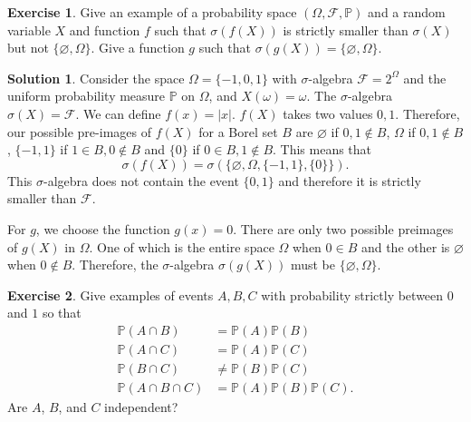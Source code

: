 \documentclass[12pt]{article}
\newcommand{\Prob}{\mathbb{P}}
\newcommand{\calF}{\mathcal{F}}
\newcommand{\abs}[1]{ \left| #1 \right| }
\theoremstyle{definition}
\newtheorem{exer}{Exercise}
\newtheorem{sol}{Solution}
\theoremstyle{remark}
\begin{document}
\begin{exer}
    Give an example of a probability space $(\Omega, \calF, \Prob)$ and a random variable $X$ and function $f$ such that $\sigma(f(X))$ is strictly smaller than $\sigma(X)$ but not $\{\varnothing, \Omega \}$. Give a function $g$ such that $\sigma(g(X)) = \{ \varnothing, \Omega\}$. 
\end{exer}

\begin{sol}
    Consider the space $\Omega = \{-1, 0, 1 \}$ with $\sigma$-algebra $\calF = 2^\Omega$ and the uniform probability measure $\Prob$ on $\Omega$, and $X(\omega) = \omega$. The $\sigma$-algebra $\sigma(X) = \calF$. We can define $f(x) = \abs{x}$. $f(X)$ takes two values $0, 1$. Therefore, our possible pre-images of $f(X)$ for a Borel set $B$ are $\varnothing$ if $0, 1 \notin B$, $\Omega$ if $0,1 \notin B$, $\{-1,1 \}$ if $1\in B, 0\not\in B$ and $\{0\}$ if $0\in B, 1\notin B$. This means that
    \begin{equation}
        \sigma(f(X)) = \sigma( \{ \varnothing, \Omega, \{-1, 1\}, \{0\} \}).
    \end{equation}
This $\sigma$-algebra does not contain the event $\{0,1\}$ and therefore it is strictly smaller than $\calF$.

For $g$, we choose the function $g(x) = 0$. There are only two possible preimages of $g(X)$ in $\Omega$. One of which is the entire space $\Omega$ when $0\in B$ and the other is $\varnothing$ when $0\not\in B$. Therefore, the $\sigma$-algebra $\sigma(g(X))$ must be $\{ \varnothing, \Omega\}$.
\end{sol}

\newpage 

\begin{exer}
    Give examples of events $A, B, C$ with probability strictly between $0$ and $1$ so that 
    \begin{align}
        \Prob( A \cap B) &= \Prob(A)\Prob(B)\\
        \Prob( A \cap C) &= \Prob(A)\Prob(C)\\
        \Prob( B \cap C) &\neq \Prob(B)\Prob(C)\\
        \Prob(A \cap B \cap C) &= \Prob(A)\Prob(B)\Prob(C).
    \end{align}
    Are $A$, $B$, and $C$ independent?
\end{exer}
\end{document}
